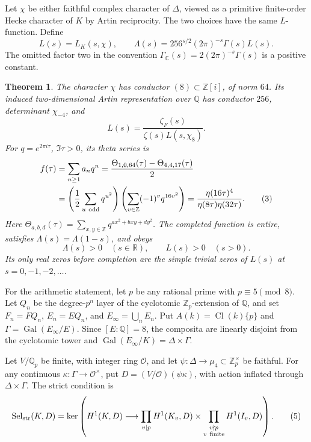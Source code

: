 \documentclass[11pt]{article}
\newtheorem{theorem}{Theorem}[section]
\newcommand{\Q}{\mathbb Q}
\newcommand{\Z}{\mathbb Z}
\newcommand{\C}{\mathbb C}
\newcommand{\Cl}{\operatorname{Cl}}
\newcommand{\Gal}{\operatorname{Gal}}
\newcommand{\Sel}{\operatorname{Sel}}
\begin{document}
Let $\chi$ be either faithful complex character of $\Delta$, viewed as
a primitive finite-order Hecke character of $K$ by Artin reciprocity.
The two choices have the same $L$-function. Define
\[
 L(s)=L_K(s,\chi),\qquad
 \Lambda(s)=256^{s/2}(2\pi)^{-s}\Gamma(s)L(s).
 \tag{1}\label{eq:completion}
\]
The omitted factor two in the convention
$\Gamma_{\C}(s)=2(2\pi)^{-s}\Gamma(s)$ is a positive constant.

\begin{theorem}\label{thm:analytic}
The character $\chi$ has conductor $(8)\subset\Z[i]$, of norm $64$.
Its induced two-dimensional Artin representation over $\Q$ has conductor
$256$, determinant $\chi_{-4}$, and
\[
 L(s)=\frac{\zeta_F(s)}{\zeta(s)L(s,\chi_8)}.
 \tag{2}\label{eq:zeta-quotient}
\]
For $q=e^{2\pi i\tau}$, $\Im\tau>0$, its theta series is
\begin{align}
 f(\tau)
 &=\sum_{n\ge1}a_nq^n
 =\frac{\Theta_{1,0,64}(\tau)-\Theta_{4,4,17}(\tau)}2 \notag\\
 &=\left(\frac12\sum_{u\ {\rm odd}}q^{u^2}\right)
       \left(\sum_{v\in\Z}(-1)^vq^{16v^2}\right)
 =\frac{\eta(16\tau)^4}{\eta(8\tau)\eta(32\tau)}.
 \tag{3}\label{eq:theta}
\end{align}
Here $\Theta_{a,b,d}(\tau)=\sum_{x,y\in\Z}q^{ax^2+bxy+dy^2}$.
The completed function is entire, satisfies
$\Lambda(s)=\Lambda(1-s)$, and obeys
\[
 \Lambda(s)>0\quad(s\in\mathbb R),\qquad L(s)>0\quad(s>0).
 \tag{4}\label{eq:positive}
\]
Its only real zeros before completion are the simple trivial zeros of
$L(s)$ at $s=0,-1,-2,\ldots$.
\end{theorem}

For the arithmetic statement, let $p$ be any rational prime with
$p\equiv5\pmod8$. Let $Q_n$ be the degree-$p^n$ layer of the
cyclotomic $\Z_p$-extension of $\Q$, and set
$F_n=FQ_n$, $E_n=EQ_n$, and $E_\infty=\bigcup_n E_n$.
Put $A(k)=\Cl(k)\{p\}$ and $\Gamma=\Gal(E_\infty/E)$.
Since $[E:\Q]=8$, the composita are linearly disjoint from the
cyclotomic tower and
$\Gal(E_\infty/K)=\Delta\times\Gamma$.

Let $V/\Q_p$ be finite, with integer ring $\mathcal O$, and let
$\psi:\Delta\longrightarrow\mu_4\subset\Z_p^\times$ be faithful.
For any continuous $\kappa:\Gamma\longrightarrow\mathcal O^\times$, put
$D=(V/\mathcal O)(\psi\kappa)$, with action inflated through
$\Delta\times\Gamma$. The strict condition is
\[
 \Sel_{\rm str}(K,D)=
 \ker\left(H^1(K,D)\longrightarrow
 \prod_{v\mid p}H^1(K_v,D)\times
 \prod_{\substack{v\nmid p\\v\ {\rm finite}}}H^1(I_v,D)\right).
 \tag{5}\label{eq:strict}
\]
\end{document}
